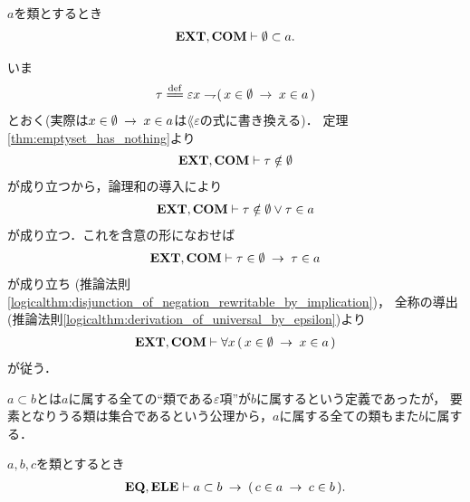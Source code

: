 	\begin{screen}
		\begin{thm}[空集合は全ての類に含まれる]
		\label{thm:emptyset_if_a_subset_of_every_class}
			$a$を類とするとき
			\begin{align}
				\mbox{{\bf EXT}},\mbox{\bf COM} \vdash \emptyset \subset a.
			\end{align}
		\end{thm}
	\end{screen}
	
	\begin{prf}
		いま
		\begin{align}
			\tau \defeq \varepsilon x \negation (\, x \in \emptyset \rarrow x \in a\, )
		\end{align}
		とおく(実際は$x \in \emptyset \hspace{0.25em}\rightarrow\hspace{0.25em} x \in a$は$\lang{\varepsilon}$の式に書き換える)．
		定理\ref{thm:emptyset_has_nothing}より
		\begin{align}
			\mbox{{\bf EXT}},\mbox{\bf COM} \vdash \tau \notin \emptyset
		\end{align}
		が成り立つから，論理和の導入により
		\begin{align}
			\mbox{{\bf EXT}},\mbox{\bf COM} \vdash \tau \notin \emptyset \vee \tau \in a
		\end{align}
		が成り立つ．これを含意の形になおせば
		\begin{align}
			\mbox{{\bf EXT}},\mbox{\bf COM} \vdash \tau \in \emptyset \hspace{0.25em}\rightarrow\hspace{0.25em} \tau \in a
		\end{align}
		が成り立ち
		(推論法則\ref{logicalthm:disjunction_of_negation_rewritable_by_implication})，
		全称の導出(推論法則\ref{logicalthm:derivation_of_universal_by_epsilon})より
		\begin{align}
			\mbox{{\bf EXT}},\mbox{\bf COM} \vdash \forall x\, (\, x \in \emptyset \hspace{0.25em}\rightarrow\hspace{0.25em} x \in a\, )
		\end{align}
		が従う．
		\QED
	\end{prf}
	
	$a \subset b$とは$a$に属する全ての``類である$\varepsilon$項''が$b$に属するという定義であったが，
	要素となりうる類は集合であるという公理から，$a$に属する全ての類もまた$b$に属する．
	
	\begin{screen}
		\begin{thm}[類はその部分類に属する全ての類を要素に持つ]
		\label{thm:subclass_contains_all_elements}
			$a,b,c$を類とするとき
			\begin{align}
				\mbox{{\bf EQ}},\mbox{{\bf ELE}} \vdash 
				a \subset b \hspace{0.25em}\rightarrow\hspace{0.25em} (\, c \in a \hspace{0.25em}\rightarrow\hspace{0.25em} c \in b\, ).
			\end{align}
		\end{thm}
	\end{screen}
	

